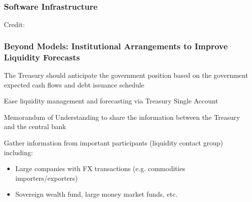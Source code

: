 \documentclass{beamer}
\newenvironment{wideitemize}{\itemize\addtolength{\itemsep}{10pt}}{\enditemize}
\begin{document}
\begin{frame}
  \frametitle{Software Infrastructure}
  \hspace*{15pt}\hbox{\scriptsize Credit:}

\end{frame}

\begin{frame}
  \frametitle{Beyond Models: Institutional Arrangements to Improve Liquidity Forecasts}

  \begin{wideitemize}
   \item The Treasury should anticipate the government position based on the government expected cash flows and debt issuance schedule
   \item Ease liquidity management and forecasting via Treasury Single Account
   \item Memorandum of Understanding to share the information between the Treasury and the central bank
   \item Gather information from important participants (liquidity contact group) including:
     \begin{itemize}
     \item Large companies with FX transactions (e.g. commodities importers/exporters)
     \item Sovereign wealth fund, large money market funds, etc.  
     \end{itemize}
  \end{wideitemize}    
\end{frame}
\end{document}
